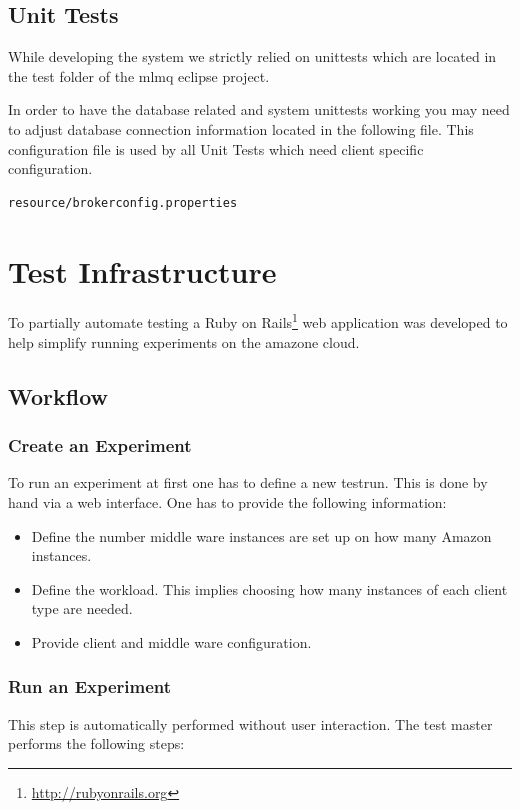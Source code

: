 \documentclass[a4paper]{article}
\begin{document}
\subsection{Unit Tests}
While developing the system we strictly relied on unittests which are located in the test folder of the mlmq eclipse project.

In order to have the database related and system unittests working you may need to adjust database connection information located in the following file. This configuration file is used by all Unit Tests which need client specific configuration.

\begin{verbatim}
resource/brokerconfig.properties
\end{verbatim}

\section{Test Infrastructure}
\label{sec:TestInfrastructure}

To partially automate testing a Ruby on Rails\footnote{\url{http://rubyonrails.org}} web application was developed to help simplify running experiments on the amazone cloud.

\subsection{Workflow}

\subsubsection{Create an Experiment}
To run an experiment at first one has to define a new testrun. This is done by hand via a web interface. One has to provide the following information:

\begin{itemize}
\item Define the number middle ware instances are set up on how many Amazon instances.
\item Define the workload. This implies choosing how many instances of each client type are needed.
\item Provide client and middle ware configuration.
\end{itemize}

\subsubsection{Run an Experiment}
This step is automatically performed without user interaction. The test master performs the following steps:
\end{document}
